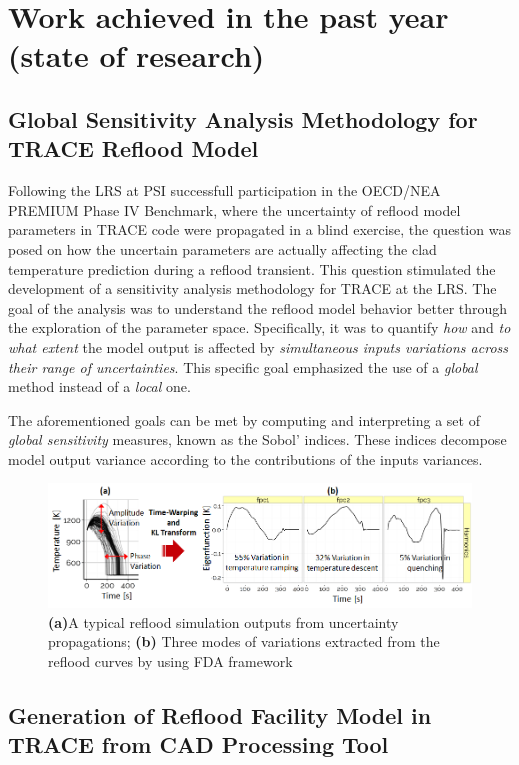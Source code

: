 \documentclass[11pt,titlepage]{article}
\begin{document}
\section{Work achieved in the past year (state of research)}

\subsection{Global Sensitivity Analysis Methodology for TRACE Reflood Model}

Following the LRS at PSI successfull participation in the OECD/NEA PREMIUM Phase IV Benchmark, where the uncertainty of reflood model parameters in TRACE code were propagated in a blind exercise, the question was posed on how the uncertain parameters are actually affecting the clad temperature prediction during a reflood transient.
This question stimulated the development of a sensitivity analysis methodology for TRACE at the LRS.
The goal of the analysis was to understand the reflood model behavior better through the exploration of the parameter space.
Specifically, it was to quantify \emph{how} and \emph{to what extent} the model output is affected by \emph{simultaneous inputs variations across their range of uncertainties}.
This specific goal emphasized the use of a \emph{global} method instead of a \emph{local} one.

The aforementioned goals can be met by computing and interpreting a set of \emph{global sensitivity} measures, known as the Sobol' indices.
These indices decompose model output variance according to the contributions of the inputs variances.

\begin{figure}[h!]
	\centering
		\includegraphics[width=\textwidth]{figures/modelOutputsOfInterest.png}
	\caption{\textbf{(a)}A typical reflood simulation outputs from uncertainty propagations; \textbf{(b)} Three modes of variations extracted from the reflood curves by using FDA framework}
\end{figure}

\subsection{Generation of Reflood Facility Model in TRACE from CAD Processing Tool} 
\end{document}
